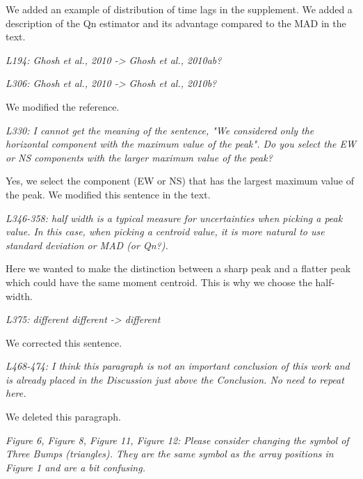 \documentclass[letterpaper, 12pt]{article}
\begin{document}
\bigskip

We added an example of distribution of time lags in the supplement. We added a description of the Qn estimator and its advantage compared to the MAD in the text.

\bigskip

\textit{L194: Ghosh et al., 2010 -> Ghosh et al., 2010ab?}

\textit{L306: Ghosh et al., 2010 -> Ghosh et al., 2010b?}

\bigskip

We modified the reference.

\bigskip

\textit{L330: I cannot get the meaning of the sentence, "We considered only the horizontal component with the maximum value of the peak". Do you select the EW or NS components with the larger maximum value of the peak?}

\bigskip

Yes, we select the component (EW or NS) that has the largest maximum value of the peak. We modified this sentence in the text.

\bigskip

\textit{L346-358: half width is a typical measure for uncertainties when picking a peak value. In this case, when picking a centroid value, it is more natural to use standard deviation or MAD (or Qn?).}

\bigskip

Here we wanted to make the distinction between a sharp peak and a flatter peak which could have the same moment centroid. This is why we choose the half-width.

\bigskip

\textit{L375: different different -> different}

\bigskip

We corrected this sentence.

\bigskip

\textit{L468-474: I think this paragraph is not an important conclusion of this work and is already placed in the Discussion just above the Conclusion. No need to repeat here.}

\bigskip

We deleted this paragraph.

\bigskip

\textit{Figure 6, Figure 8, Figure 11, Figure 12: Please consider changing the symbol of Three Bumps (triangles). They are the same symbol as the array positions in Figure 1 and are a bit confusing.}
\end{document}
